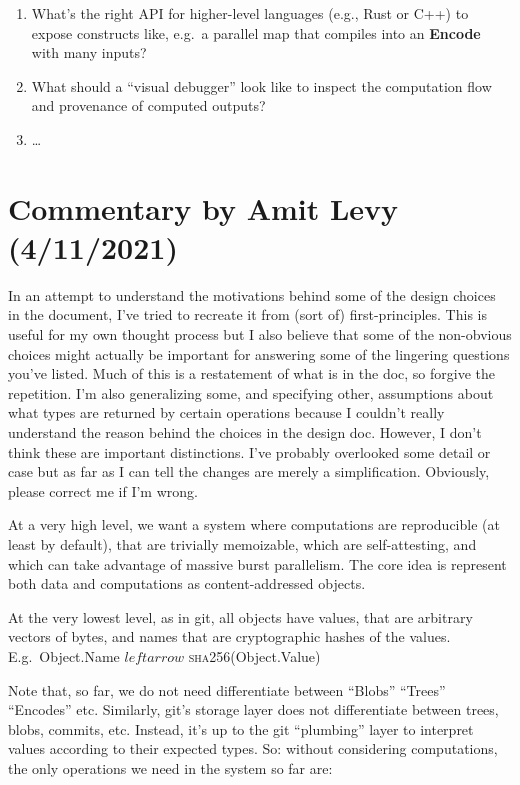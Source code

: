 \documentclass{article}
\newcommand{\encode}{\textbf{Encode}\xspace}
\newcommand{\bs}{\vspace{\baselineskip}}
\begin{document}
\begin{enumerate}[itemsep=0pt]
\item What's the right API for higher-level languages (e.g., Rust or C++) to expose constructs like, e.g.~a parallel map that compiles into an \encode with many inputs?

\item What should a ``visual debugger'' look like to inspect the computation flow and provenance of computed outputs?
  
\item \ldots
  
\end{enumerate}

\section{Commentary by Amit Levy (4/11/2021)}

In an attempt to understand the motivations behind some of the design
choices in the document, I've tried to recreate it from (sort of)
first-principles. This is useful for my own thought process but I also
believe that some of the non-obvious choices might actually be
important for answering some of the lingering questions you've
listed. Much of this is a restatement of what is in the doc, so
forgive the repetition. I'm also generalizing some, and specifying
other, assumptions about what types are returned by certain operations
because I couldn't really understand the reason behind the choices in
the design doc. However, I don't think these are important
distinctions. I've probably overlooked some detail or case but as far
as I can tell the changes are merely a simplification. Obviously,
please correct me if I'm wrong.

\bs

At a very high level, we want a system where computations are
reproducible (at least by default), that are trivially memoizable,
which are self-attesting, and which can take advantage of massive
burst parallelism. The core idea is represent both data and
computations as content-addressed objects.

\bs

At the very lowest level, as in git, all objects have values, that are
arbitrary vectors of bytes, and names that are cryptographic hashes of
the values. E.g.~Object.Name $leftarrow$ \textsc{sha256}(Object.Value)

\bs

Note that, so far, we do not need differentiate between ``Blobs''
``Trees'' ``Encodes'' etc. Similarly, git's storage layer does not
differentiate between trees, blobs, commits, etc. Instead, it's up to
the git ``plumbing'' layer to interpret values according to their
expected types. So: without considering computations, the only
operations we need in the system so far are:
\end{document}
